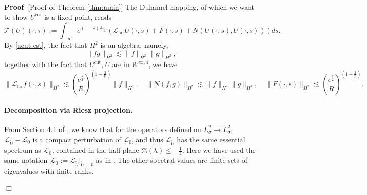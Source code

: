 \documentclass[11pt,a4paper]{article}
\numberwithin{equation}{section}
\newcommand{\assign}{:=}
\newcommand{\tmop}[1]{\ensuremath{\operatorname{#1}}}
\newenvironment{proof}{\noindent\textbf{Proof\ }}{\hspace*{\fill}$\Box$\medskip}
\begin{document}
\begin{proof}[Proof of Theorem \ref{thm:main}]
The Duhamel mapping, of which we want to show $U^{\text{cor}}$ is a fixed point, reads \begin{equation}
    \mathcal{T}(U)(\cdot,\tau)\assign\int_{-\infty}^\tau e^{(\tau-s)\mathcal{L}_{\widetilde{U}}}(\mathcal{L}_{\tmop{far}}U(\cdot,s)+F(\cdot,s)+N(U(\cdot,s),U(\cdot,s)))ds.\label{duh1}
\end{equation}
By \eqref{ucut est},  the fact that $H^2$ is an algebra, namely,
\[
\| f g \|_{H^2} \lesssim \| f \|_{H^2} \| g \|_{H^2},
\]
together with the fact that $U^{\text{cut}}, \widetilde{U}$ are in $W^{\infty,4}$, we have \begin{equation}
\|\mathcal{L}_{\tmop{far}}f(\cdot,s)\|_{H^2}\lesssim(\frac{e^{\frac s2}}{R})^{(1-\frac{3}{p})}\|f\|_{H^3},\quad\|N(f,g)\|_{H^2}\lesssim\|f\|_{H^3}\|g\|_{H^3},\quad\|F(\cdot,s)\|_{H^2}\lesssim(\frac{e^{\frac s2}}{R})^{(1-\frac{3}{p})}.
    \label{nl est}
\end{equation}
\paragraph{Decomposition via Riesz projection.} From Section 4.1 of \cite{albritton2022non}, we know that for the operators defined on $L^2_\sigma\to L^2_\sigma$, $\mathcal{L}_{\widetilde{U}}-\mathcal{L}_{0}$ is a compact perturbation of $\mathcal{L}_{0}$, and thus $\mathcal{L}_{\widetilde{U}}$ has the same essential spectrum as $\mathcal{L}_{0}$, contained in the half-plane $\Re(\lambda)\leqslant-\frac14$. Here we have used the same notation $\mathcal{L}_0 := \mathcal{L}_{\widetilde U}\big|_{\widetilde U\equiv 0}$ as in \cite{albritton2022non,jia2015incompressible}. The other spectral values are finite sets of eigenvalues with finite ranks.


\end{proof}
\end{document}
